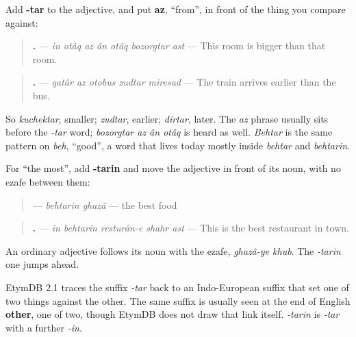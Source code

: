 \begin{grammarlens}[title={Grammar Lens: -tar, and az for \textquotedblleft{}than\textquotedblright{}}]
Add \textbf{-tar} to the adjective, and put \textbf{az}, \textquotedblleft{}from\textquotedblright{}, in front of the thing you compare against:

\begin{quote}
\textbf{      .} — \emph{in otâq az ân otâq bozorgtar ast} — This room is bigger than that room.
\end{quote}

\begin{quote}
\textbf{    .} — \emph{qatâr az otobus zudtar miresad} — The train arrives earlier than the bus.
\end{quote}

So \emph{kuchektar}, smaller; \emph{zudtar}, earlier; \emph{dirtar}, later. The \emph{az} phrase usually sits before the \emph{-tar} word; \emph{bozorgtar az ân otâq} is heard as well. \emph{Behtar} is the same pattern on \emph{beh}, \textquotedblleft{}good\textquotedblright{}, a word that lives today mostly inside \emph{behtar} and \emph{behtarin}.
\end{grammarlens}

\begin{grammarlens}[title={Grammar Lens: -tarin, in front of the noun}]
For \textquotedblleft{}the most\textquotedblright{}, add \textbf{-tarin} and move the adjective in front of its noun, with no ezafe between them:

\begin{quote}
\textbf{ } — \emph{behtarin ghazâ} — the best food
\end{quote}

\begin{quote}
\textbf{    .} — \emph{in behtarin resturân-e shahr ast} — This is the best restaurant in town.
\end{quote}

An ordinary adjective follows its noun with the ezafe, \emph{ghazâ-ye khub}. The \emph{-tarin} one jumps ahead.
\end{grammarlens}

\begin{cousinweb}
EtymDB 2.1 traces the suffix \emph{-tar} back to an Indo-European suffix that set one of two things against the other. The same suffix is usually seen at the end of English \textbf{other}, one of two, though EtymDB does not draw that link itself. \emph{-tarin} is \emph{-tar} with a further \emph{-in}.
\end{cousinweb}

